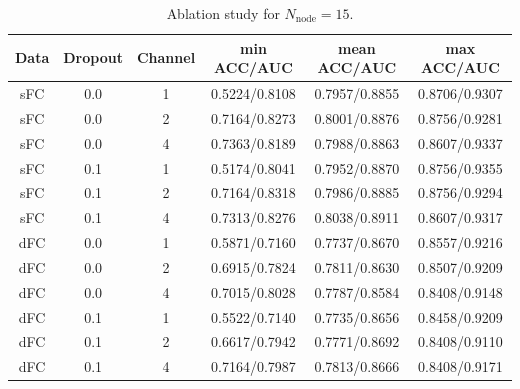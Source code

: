 \documentclass[11pt]{article}
\begin{document}
\begin{table}[H]
    \centering
    \begin{tabular}{|c|c|c|c|c|c|}
        \hline
        Data & Dropout & Channel & min ACC/AUC   & mean ACC/AUC  & max ACC/AUC   \\
        \hline
        sFC  & 0.0     & 1       & 0.5224/0.8108 & 0.7957/0.8855 & 0.8706/0.9307 \\
        \hline
        sFC  & 0.0     & 2       & 0.7164/0.8273 & 0.8001/0.8876 & 0.8756/0.9281 \\
        \hline
        sFC  & 0.0     & 4       & 0.7363/0.8189 & 0.7988/0.8863 & 0.8607/0.9337 \\
        \hline
        sFC  & 0.1     & 1       & 0.5174/0.8041 & 0.7952/0.8870 & 0.8756/0.9355 \\
        \hline
        sFC  & 0.1     & 2       & 0.7164/0.8318 & 0.7986/0.8885 & 0.8756/0.9294 \\
        \hline
        sFC  & 0.1     & 4       & 0.7313/0.8276 & 0.8038/0.8911 & 0.8607/0.9317 \\
        \hline
        dFC  & 0.0     & 1       & 0.5871/0.7160 & 0.7737/0.8670 & 0.8557/0.9216 \\
        \hline
        dFC  & 0.0     & 2       & 0.6915/0.7824 & 0.7811/0.8630 & 0.8507/0.9209 \\
        \hline
        dFC  & 0.0     & 4       & 0.7015/0.8028 & 0.7787/0.8584 & 0.8408/0.9148 \\
        \hline
        dFC  & 0.1     & 1       & 0.5522/0.7140 & 0.7735/0.8656 & 0.8458/0.9209 \\
        \hline
        dFC  & 0.1     & 2       & 0.6617/0.7942 & 0.7771/0.8692 & 0.8408/0.9110 \\
        \hline
        dFC  & 0.1     & 4       & 0.7164/0.7987 & 0.7813/0.8666 & 0.8408/0.9171 \\
        \hline
    \end{tabular}
    \caption{Ablation study for $N_{\text{node}} = 15$.}
\end{table}
\end{document}
